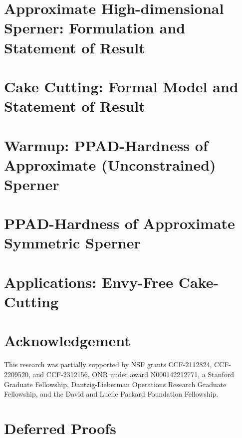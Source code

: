 \documentclass[letterpaper,11pt]{article}
\begin{document}
\section{Approximate High-dimensional Sperner: Formulation and Statement of Result}
\label{sec:3color}


\section{Cake Cutting: Formal Model and Statement of Result}



\section{Warmup: PPAD-Hardness of Approximate (Unconstrained) Sperner}
\label{sec:warmup-proof-for-approx-sperner}


\section{PPAD-Hardness of Approximate Symmetric Sperner}
\label{sec:final-proof-for-approx-sperner}


\section{Applications: Envy-Free Cake-Cutting}
\label{sec:cake-cutting}



\section*{Acknowledgement}
This research was partially supported by NSF grants CCF-2112824, CCF-2209520, and CCF-2312156, ONR under award N000142212771, a Stanford Graduate Fellowship, Dantzig-Lieberman Operations Research Graduate Fellowship, and the David and Lucile Packard Foundation Fellowship.

\printbibliography

\appendix

\section{Deferred Proofs}
\label{app:omitted-new}

\end{document}
